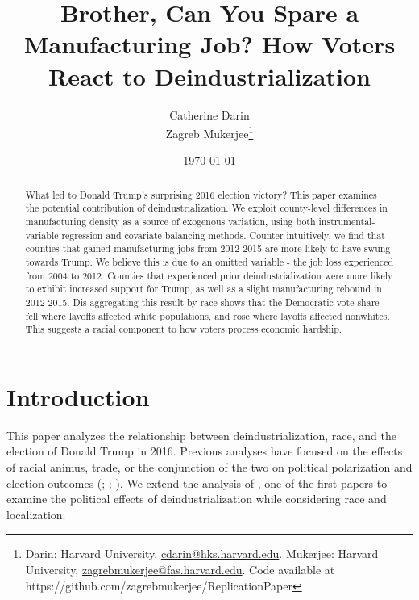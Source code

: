 \documentclass[]{AEA}
\begin{document}
\title{Brother, Can You Spare a Manufacturing Job? How Voters React to
Deindustrialization}


\author{
  Catherine Darin\\
  Zagreb Mukerjee\thanks{
  Darin: Harvard University, \href{mailto:cdarin@hks.harvard.edu}{cdarin@hks.harvard.edu}.
  Mukerjee: Harvard University, \href{mailto:zagrebmukerjee@fas.harvard.edu}{zagrebmukerjee@fas.harvard.edu}.
  Code available at https://github.com/zagrebmukerjee/ReplicationPaper
}
}

\date{\today}
\pubVolume{}
\pubIssue{}
\JEL{}
\Keywords{}

\begin{abstract}
What led to Donald Trump's surprising 2016 election victory? This paper
examines the potential contribution of deindustrialization. We exploit
county-level differences in manufacturing density as a source of
exogenous variation, using both instrumental-variable regression and
covariate balancing methods. Counter-intuitively, we find that counties
that gained manufacturing jobs from 2012-2015 are more likely to have
swung towards Trump. We believe this is due to an omitted variable - the
job loss experienced from 2004 to 2012. Counties that experienced prior
deindustrialization were more likely to exhibit increased support for
Trump, as well as a slight manufacturing rebound in 2012-2015.
Dis-aggregating this result by race shows that the Democratic vote share
fell where layoffs affected white populations, and rose where layoffs
affected nonwhites. This suggests a racial component to how voters
process economic hardship.
\end{abstract}


\maketitle

\section{Introduction} 
\label{Introduction}

This paper analyzes the relationship between deindustrialization, race,
and the election of Donald Trump in 2016. Previous analyses have focused
on the effects of racial animus, trade, or the conjunction of the two on
political polarization and election outcomes (\cite{Autor20};
\cite{Che16}; \cite{BR21}). We extend the analysis of \cite{Baccini21},
one of the first papers to examine the political effects of
deindustrialization while considering race and localization.
\end{document}
